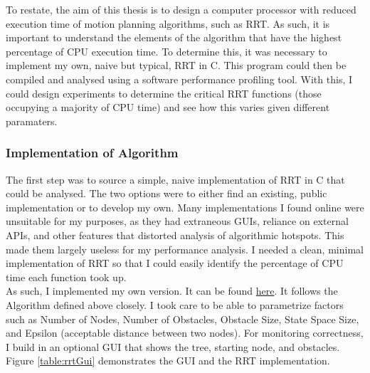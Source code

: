 
To restate, the aim of this thesis is to design a computer processor with reduced execution time of motion planning algorithms, such as \ac{RRT}. As such, it is important to understand the elements of the algorithm that have the highest percentage of CPU execution time. To determine this, it was necessary to implement my own, naive but typical, \ac{RRT} in C. This program could then be compiled and analysed using a software performance profiling tool. With this, I could design experiments to determine the critical RRT functions (those occupying a majority of CPU time) and see how this varies given different paramaters.

\subsubsection{Implementation of Algorithm}
The first step was to source a simple, naive implementation of RRT in C that could be analysed. The two options were to either find an existing, public implementation or to develop my own. Many implementations I found online\cite{RoboJackets2019}\cite{Planning2019}\cite{Sourishg2017}\cite{Vss2sn2019} were unsuitable for my purposes, as they had extraneous \ac{GUI}s, reliance on external \ac{API}s, and other features that distorted analysis of algorithmic hotspots. This made them largely useless for my performance analysis. I needed a clean, minimal implementation of RRT so that I could easily identify the percentage of CPU time each function took up.  \\ 

As such, I implemented my own version. It can be found \href{https://github.com/AnthonyKenny98/Thesis/tree/master/my_rrt}{here}. It follows the Algorithm defined above closely. I took care to be able to parametrize factors such as Number of Nodes, Number of Obstacles, Obstacle Size, State Space Size, and Epsilon (acceptable distance between two nodes). For monitoring correctness, I build in an optional \ac{GUI} that shows the tree, starting node, and obstacles. Figure \ref{table:rrtGui} demonstrates the \ac{GUI} and the \ac{RRT} implementation.

